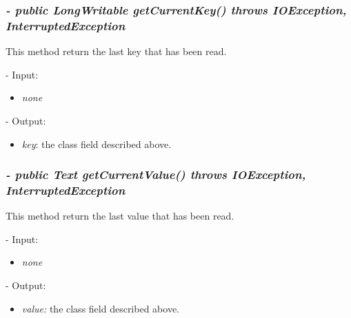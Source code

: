 \documentclass[]{report}
\begin{document}
	\subsubsection*{\textit{\textbf{-} public LongWritable getCurrentKey() throws IOException, InterruptedException}}   	
	This method return the last key that has been read.   
	\begin{description}
		\item - Input:
		\begin{itemize}
			\item \textit{none}
		\end{itemize}
	\end{description}	
	\begin{description}
		\item - Output:
		\begin{itemize}
			\item \textit{key}: the class field described above. 
		\end{itemize}
	\end{description}

	\subsubsection*{\textit{\textbf{-} public Text getCurrentValue() throws IOException, InterruptedException}}   	
	This method return the last value that has been read.    
	\begin{description}
		\item - Input:
		\begin{itemize}
			\item \textit{none}
		\end{itemize}
	\end{description}	
	\begin{description}
		\item - Output:
		\begin{itemize}
			\item \textit{value:} the class field described above.  
		\end{itemize}
	\end{description}
\end{document}

